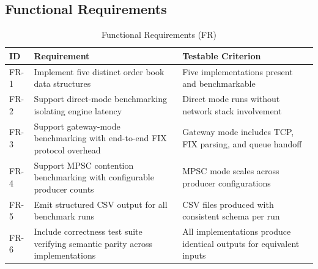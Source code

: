 \subsection{Functional Requirements}
\begin{table}[H]
    \centering
    \small
    \begin{tabular}{lp{5cm}p{6.5cm}}
        \toprule
        \textbf{ID} & \textbf{Requirement} & \textbf{Testable Criterion} \\
        \midrule
        \label{fr:1} FR-1 & Implement five distinct order book data structures & Five implementations present and benchmarkable \\
        \label{fr:2} FR-2 & Support direct-mode benchmarking isolating engine latency & Direct mode runs without network stack involvement \\
        \label{fr:3} FR-3 & Support gateway-mode benchmarking with end-to-end FIX protocol overhead & Gateway mode includes TCP, FIX parsing, and queue handoff \\
        \label{fr:4} FR-4 & Support MPSC contention benchmarking with configurable producer counts & MPSC mode scales across producer configurations \\
        \label{fr:5} FR-5 & Emit structured CSV output for all benchmark runs & CSV files produced with consistent schema per run \\
        \label{fr:6} FR-6 & Include correctness test suite verifying semantic parity across implementations & All implementations produce identical outputs for equivalent inputs \\
        \bottomrule
    \end{tabular}
    \caption{Functional Requirements (FR)}
    \label{tab:functional_requirements}
\end{table}

